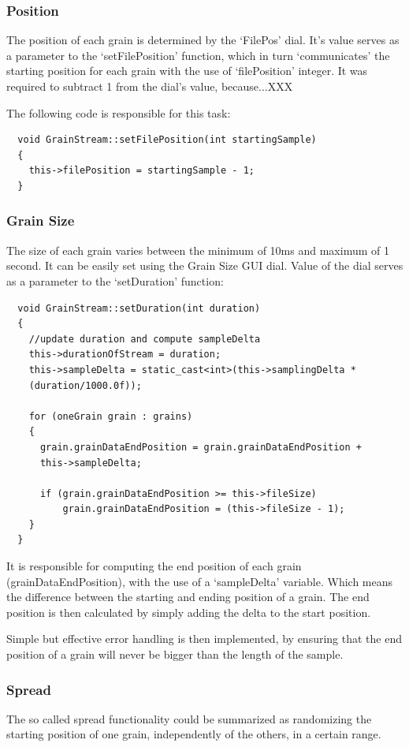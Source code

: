 \subsubsection{Position}
The position of each grain is determined by the `FilePos' dial. It's
value serves as a parameter to the `setFilePosition' function, which
in turn `communicates' the starting position for each grain with the
use of `filePosition' integer. It was required to subtract 1 from the
dial's value, because...XXX

The following code is responsible for
this task:

\begin{lstlisting}
  void GrainStream::setFilePosition(int startingSample)
  {
    this->filePosition = startingSample - 1;
  }
\end{lstlisting}

\subsubsection{Grain Size}
The size of each grain varies between the minimum of 10ms and maximum
of 1 second. It can be easily set using the Grain Size GUI dial. Value
of the dial serves as a parameter to the `setDuration' function:
\begin{lstlisting}
  void GrainStream::setDuration(int duration)
  {
    //update duration and compute sampleDelta
    this->durationOfStream = duration;
    this->sampleDelta = static_cast<int>(this->samplingDelta *
    (duration/1000.0f));

    for (oneGrain grain : grains)
    {
      grain.grainDataEndPosition = grain.grainDataEndPosition +
      this->sampleDelta;

      if (grain.grainDataEndPosition >= this->fileSize)
          grain.grainDataEndPosition = (this->fileSize - 1);
    }
  }
\end{lstlisting}

It is responsible for computing the end position of each grain
(grainDataEndPosition), with the use of a `sampleDelta'
variable. Which means the difference between the starting and ending
position of a grain. The end position is then calculated by simply
adding the delta to the start position.

Simple but effective error handling is then implemented, by ensuring
that the end position of a grain will never be bigger than the length
of the sample.

\subsubsection{Spread}
The so called spread functionality could be summarized as randomizing
the starting position of one grain, independently of the others, in a
certain range.

